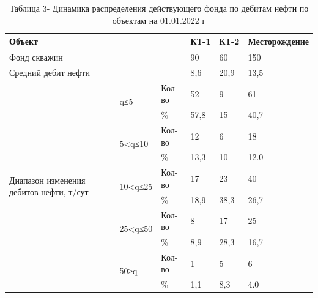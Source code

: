 \begin{table}[H]
\caption*{Таблица 3- Динамика распределения действующего фонда по дебитам нефти по объектам на 01.01.2022 г}
\centering
\begin{tabular}{|lll|l|l|l|}
\hline
\multicolumn{3}{|l|}{Объект} & КТ-1 & КТ-2 & Месторождение \\ \hline
\multicolumn{3}{|l|}{Фонд скважин} & 90 & 60 & 150 \\ \hline
\multicolumn{3}{|l|}{Средний дебит нефти} & 8,6 & 20,9 & 13,5 \\ \hline
\multicolumn{1}{|p{0.2\textwidth}|}{\multirow{10}{=}{Диапазон изменения дебитов нефти, т/сут}} & \multicolumn{1}{l|}{\multirow{2}{*}{q≤5}} & Кол-во & 52 & 9 & 61 \\ \cline{3-6} 
\multicolumn{1}{|l|}{} & \multicolumn{1}{l|}{} & \% & 57,8 & 15 & 40,7 \\ \cline{2-6} 
\multicolumn{1}{|l|}{} & \multicolumn{1}{l|}{\multirow{2}{*}{5<q≤10}} & Кол-во & 12 & 6 & 18 \\ \cline{3-6} 
\multicolumn{1}{|l|}{} & \multicolumn{1}{l|}{} & \% & 13,3 & 10 & 12.0 \\ \cline{2-6} 
\multicolumn{1}{|l|}{} & \multicolumn{1}{l|}{\multirow{2}{*}{10<q≤25}} & Кол-во & 17 & 23 & 40 \\ \cline{3-6} 
\multicolumn{1}{|l|}{} & \multicolumn{1}{l|}{} & \% & 18,9 & 38,3 & 26,7 \\ \cline{2-6} 
\multicolumn{1}{|l|}{} & \multicolumn{1}{l|}{\multirow{2}{*}{25<q≤50}} & Кол-во & 8 & 17 & 25 \\ \cline{3-6} 
\multicolumn{1}{|l|}{} & \multicolumn{1}{l|}{} & \% & 8,9 & 28,3 & 16,7 \\ \cline{2-6} 
\multicolumn{1}{|l|}{} & \multicolumn{1}{l|}{\multirow{2}{*}{50≥q}} & Кол-во & 1 & 5 & 6 \\ \cline{3-6} 
\multicolumn{1}{|l|}{} & \multicolumn{1}{l|}{} & \% & 1,1 & 8,3 & 4.0 \\ \hline
\end{tabular}
\end{table}

